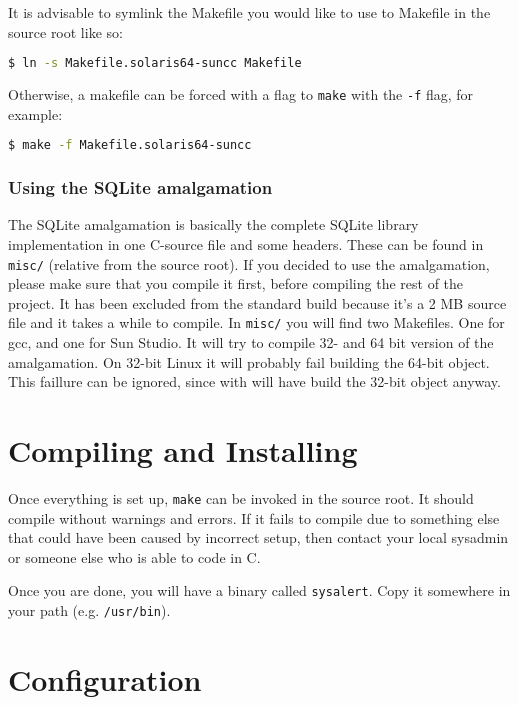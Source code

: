 \documentclass[a4paper,10pt,titlepage]{book}
\begin{document}
It is advisable to symlink the Makefile you would like to use to Makefile in the source root like so:

\begin{lstlisting}[language=bash]
$ ln -s Makefile.solaris64-suncc Makefile
\end{lstlisting}

Otherwise, a makefile can be forced with a flag to \texttt{make} with the \texttt{-f} flag, for example:

\begin{lstlisting}[language=bash]
$ make -f Makefile.solaris64-suncc
\end{lstlisting}

\subsubsection{Using the SQLite amalgamation}

The SQLite amalgamation is basically the complete SQLite library implementation in one C-source file and some headers. These can be found in \texttt{misc/} (relative from the source root). If you decided to use the amalgamation, please make sure that you compile it first, before compiling the rest of the project. It has been excluded from the standard build because it's a 2 MB source file and it takes a while to compile. In \texttt{misc/} you will find two Makefiles. One for gcc, and one for Sun Studio. It will try to compile 32- and 64 bit version of the amalgamation. On 32-bit Linux it will probably fail building the 64-bit object. This faillure can be ignored, since with will have build the 32-bit object anyway.

\section{Compiling and Installing}

Once everything is set up, \texttt{make} can be invoked in the source root. It should compile without warnings and errors. If it fails to compile due to something else that could have been caused by incorrect setup, then contact your local sysadmin or someone else who is able to code in C.

Once you are done, you will have a binary called \texttt{sysalert}. Copy it somewhere in your path (e.g. \texttt{/usr/bin}).

\section{Configuration}
\end{document}
